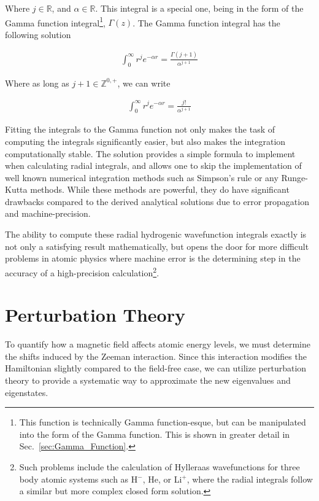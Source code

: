            Where $j \in \mathbb{R}$, and $\alpha \in \mathbb{R}$. This integral is a special one, being in the form of the Gamma function integral\footnote{This function is technically Gamma function-esque, but can be manipulated into the form of the Gamma function. This is shown in greater detail in Sec.~\ref{sec:Gamma_Function}.}, $\Gamma(z)$. The Gamma function integral has the following solution 

            \begin{align}
                \int_0^\infty r^j e^{-\alpha r} = \frac{\Gamma(j + 1)}{\alpha^{j + 1}}
            \end{align}

            Where as long as $j + 1 \in \mathbb{Z}^{0,+}$, we can write

            \begin{align}
                \int_0^\infty r^j e^{-\alpha r} = \frac{j!}{\alpha^{j + 1}}
            \end{align}

            Fitting the integrals to the Gamma function not only makes the task of computing the integrals significantly easier, but also makes the integration computationally stable. The solution provides a simple formula to implement when calculating radial integrals, and allows one to skip the implementation of well known numerical integration methods such as Simpson's rule or any Runge-Kutta methods. While these methods are powerful, they do have significant drawbacks compared to the derived analytical solutions due to error propagation and machine-precision.
            
            The ability to compute these radial hydrogenic wavefunction integrals exactly is not only a satisfying result mathematically, but opens the door for more difficult problems in atomic physics where machine error is the determining step in the accuracy of a high-precision calculation\footnote{Such problems include the calculation of Hylleraas wavefunctions for three body atomic systems such as H$^-$, He, or Li$^+$, where the radial integrals follow a similar but more complex closed form solution.}.
            
            

    \section{Perturbation Theory} \label{sec:Perturbation_Theory}
        To quantify how a magnetic field affects atomic energy levels, we must determine the shifts induced by the Zeeman interaction. Since this interaction modifies the Hamiltonian slightly compared to the field-free case, we can utilize perturbation theory to provide a systematic way to approximate the new eigenvalues and eigenstates.\\

